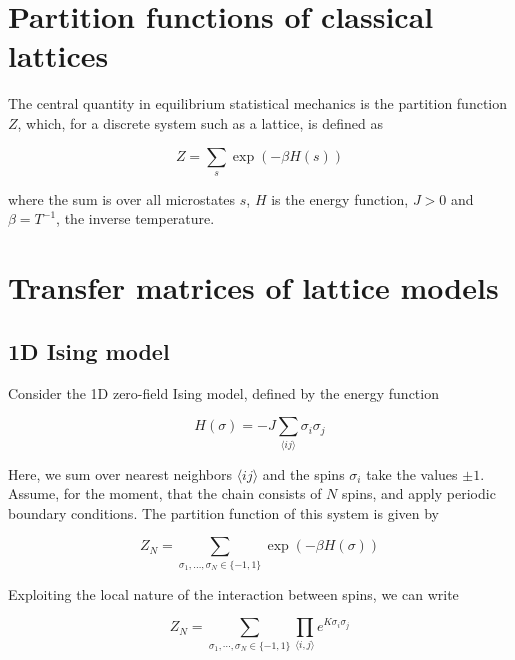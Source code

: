 \section{Partition functions of classical lattices}
The central quantity in equilibrium statistical mechanics is the partition
function $Z$, which, for a discrete system such as a lattice, is defined as

\begin{equation}
  Z = \sum_{s} \exp{(-\beta H(s))}
\end{equation}

where the sum is over all microstates $s$, $H$ is the energy function, $J > 0$ and
$\beta = T^{-1}$, the inverse temperature.

\section{Transfer matrices of lattice models}

\subsection{1D Ising model}


Consider the 1D zero-field Ising model, defined by the energy function

\begin{equation}\label{ising_energy_function}
  H(\sigma) = -J \sum_{\langle i j \rangle} \sigma_i \sigma_j
\end{equation}

Here, we sum over nearest neighbors $\langle i j \rangle$ and the spins
$\sigma_i$ take the values $\pm 1$. Assume, for the moment, that the chain
consists of $N$ spins, and apply periodic boundary conditions.
The partition function of this system is given by

\begin{equation}
  Z_{N} = \sum_{\sigma_1, \dotsc, \sigma_N \in \{-1, 1\}} \exp (-\beta H(\sigma))
\end{equation}

Exploiting the local nature of the interaction between spins, we can write

\begin{equation}
  Z_{N} = \sum_{\sigma_1, \cdots, \sigma_N \in \{-1, 1\}} \prod_{\langle i, j \rangle} e^{K\sigma_i \sigma_j}
\end{equation}

